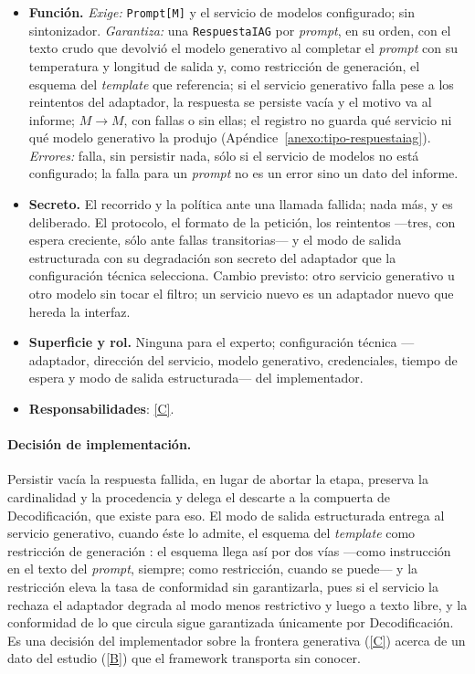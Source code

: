 \documentclass[12pt]{report}
\DeclareRobustCommand{\resp}[1]{\hyperref[tab:registro-responsabilidades]{\textcolor{respcolor}{[#1]}}}
\begin{document}
\begin{itemize}
  \item \textbf{Función.} \textit{Exige:} \texttt{Prompt[M]} y el servicio de modelos configurado; sin sintonizador. \textit{Garantiza:} una \texttt{RespuestaIAG} por \textit{prompt}, en su orden, con el texto crudo que devolvió el modelo generativo al completar el \textit{prompt} con su temperatura y longitud de salida y, como restricción de generación, el esquema del \textit{template} que referencia; si el servicio generativo falla pese a los reintentos del adaptador, la respuesta se persiste vacía y el motivo va al informe; \(M \to M\), con fallas o sin ellas; el registro no guarda qué servicio ni qué modelo generativo la produjo (Apéndice~\ref{anexo:tipo-respuestaiag}). \textit{Errores:} falla, sin persistir nada, sólo si el servicio de modelos no está configurado; la falla para un \textit{prompt} no es un error sino un dato del informe.
  \item \textbf{Secreto.} El recorrido y la política ante una llamada fallida; nada más, y es deliberado. El protocolo, el formato de la petición, los reintentos ---tres, con espera creciente, sólo ante fallas transitorias--- y el modo de salida estructurada con su degradación son secreto del adaptador que la configuración técnica selecciona. Cambio previsto: otro servicio generativo u otro modelo sin tocar el filtro; un servicio nuevo es un adaptador nuevo que hereda la interfaz.
  \item \textbf{Superficie y rol.} Ninguna para el experto; configuración técnica ---adaptador, dirección del servicio, modelo generativo, credenciales, tiempo de espera y modo de salida estructurada--- del implementador.
  \item \textbf{Responsabilidades}: \resp{C}.
\end{itemize}

\paragraph{Decisión de implementación.} Persistir vacía la respuesta fallida, en lugar de abortar la etapa, preserva la cardinalidad y la procedencia y delega el descarte a la compuerta de Decodificación, que existe para eso. El modo de salida estructurada entrega al servicio generativo, cuando éste lo admite, el esquema del \textit{template} como restricción de generación \citep{geng:2025}: el esquema llega así por dos vías ---como instrucción en el texto del \textit{prompt}, siempre; como restricción, cuando se puede--- y la restricción eleva la tasa de conformidad sin garantizarla, pues si el servicio la rechaza el adaptador degrada al modo menos restrictivo y luego a texto libre, y la conformidad de lo que circula sigue garantizada únicamente por Decodificación. Es una decisión del implementador sobre la frontera generativa (\resp{C}) acerca de un dato del estudio (\resp{B}) que el framework transporta sin conocer. %
\end{document}

